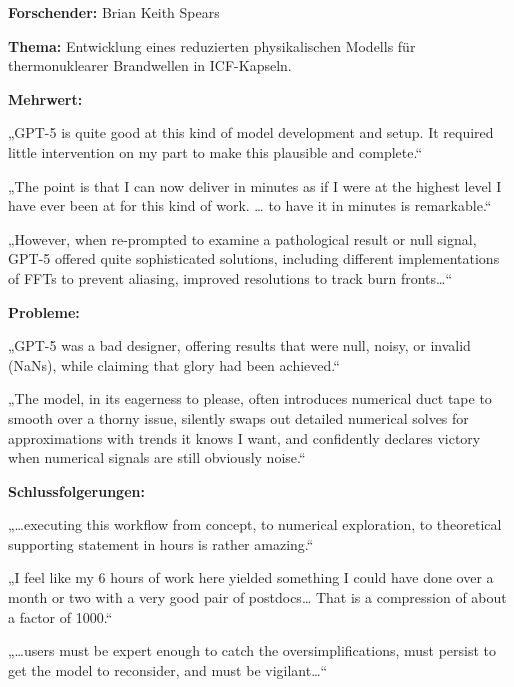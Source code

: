\documentclass[
  ngerman,
  letterpaper,
  DIV=11]{scrreprt}
\begin{document}
\begin{tcolorbox}[enhanced jigsaw, left=2mm, bottomrule=.15mm, arc=.35mm, rightrule=.15mm, colframe=quarto-callout-note-color-frame, coltitle=black, colback=white, toprule=.15mm, toptitle=1mm, colbacktitle=quarto-callout-note-color!10!white, title=\textcolor{quarto-callout-note-color}{\faInfo}\hspace{0.5em}{Physik / Fusionsforschung: Thermonukleare Brandwellen}, opacitybacktitle=0.6, leftrule=.75mm, bottomtitle=1mm, titlerule=0mm, opacityback=0, breakable]

\textbf{Forschender:} Brian Keith Spears

\textbf{Thema:} Entwicklung eines reduzierten physikalischen Modells für
thermonuklearer Brandwellen in ICF-Kapseln.

\textbf{Mehrwert:}

„GPT-5 is quite good at this kind of model development and setup. It
required little intervention on my part to make this plausible and
complete.``

„The point is that I can now deliver in minutes as if I were at the
highest level I have ever been at for this kind of work. \ldots{} to
have it in minutes is remarkable.``

„However, when re-prompted to examine a pathological result or null
signal, GPT-5 offered quite sophisticated solutions, including different
implementations of FFTs to prevent aliasing, improved resolutions to
track burn fronts\ldots``

\textbf{Probleme:}

„GPT-5 was a bad designer, offering results that were null, noisy, or
invalid (NaNs), while claiming that glory had been achieved.``

„The model, in its eagerness to please, often introduces numerical duct
tape to smooth over a thorny issue, silently swaps out detailed
numerical solves for approximations with trends it knows I want, and
confidently declares victory when numerical signals are still obviously
noise.``

\textbf{Schlussfolgerungen:}

„\ldots executing this workflow from concept, to numerical exploration,
to theoretical supporting statement in hours is rather amazing.``

„I feel like my 6 hours of work here yielded something I could have done
over a month or two with a very good pair of postdocs\ldots{} That is a
compression of about a factor of 1000.``

„\ldots users must be expert enough to catch the oversimplifications,
must persist to get the model to reconsider, and must be
vigilant\ldots``

\end{tcolorbox}
\end{document}
